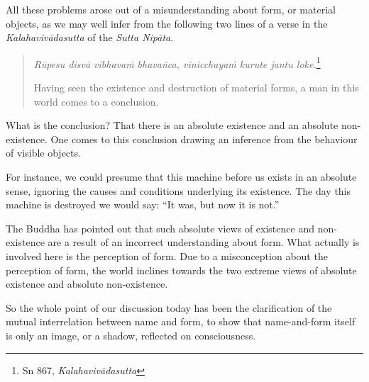 All these problems arose out of a misunderstanding about form, or material objects, as we may well infer from the following two lines of a verse in the \emph{Kalahavivādasutta} of the \emph{Sutta Nipāta}.

\begin{quote}
\emph{Rūpesu disvā vibhavaṁ bhavañca, vinicchayaṁ kurute jantu loke.}\footnote{Sn 867, \emph{Kalahavivādasutta}}

Having seen the existence and destruction of material forms, a man in this world comes to a conclusion.
\end{quote}

What is the conclusion? That there is an absolute existence and an absolute non-existence. One comes to this conclusion drawing an inference from the behaviour of visible objects.

For instance, we could presume that this machine before us exists in an absolute sense, ignoring the causes and conditions underlying its existence. The day this machine is destroyed we would say: ``It was, but now it is not.''

The Buddha has pointed out that such absolute views of existence and non-existence are a result of an incorrect understanding about form. What actually is involved here is the perception of form. Due to a misconception about the perception of form, the world inclines towards the two extreme views of absolute existence and absolute non-existence.

So the whole point of our discussion today has been the clarification of the mutual interrelation between name and form, to show that name-and-form itself is only an image, or a shadow, reflected on consciousness.
